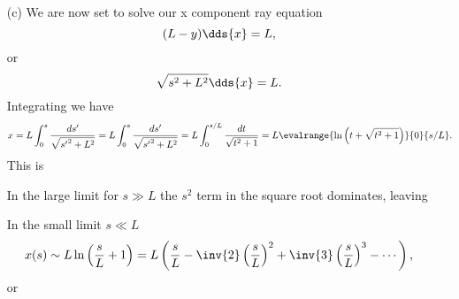 {\begin{enumerate}
In the large limit for \(s \gg L\) the \(s^2\) term dominates, leaving
A plot of \(y/L\), \(-s/L\), and \(-s^2/2 L^2\) can be found in \cref{fig:modernOpticsProblemSet1:modernOpticsProblemSet1Fig2b} and \cref{fig:modernOpticsProblemSet1:modernOpticsProblemSet1Fig2bBig}.
%
%
\item[(c)]
We are now set to solve our x component ray equation
%
\begin{equation}\label{eqn:modernOpticsProblemSet1P2:290}
(L - y) \dds{x} = L,
\end{equation}
%
or
\begin{equation}\label{eqn:modernOpticsProblemSet1P2:310}
\sqrt{s^2 + L^2} \dds{x} = L.
\end{equation}
%
Integrating we have
%
\begin{dmath}\label{eqn:modernOpticsProblemSet1P2:330}
x
= L \int_0^s \frac{ds'}{\sqrt{{s'}^2 + L^2}}
= L \int_0^s \frac{ds'}{\sqrt{{s'}^2 + L^2}}
= L \int_0^{s/L} \frac{dt}{\sqrt{t^2 + 1}}
= L \evalrange{ \ln\left( t + \sqrt{ t^2 + 1} \right) }{0}{s/L}.
\end{dmath}
%
This is

In the large limit for \(s \gg L\) the \(s^2\) term in the square root dominates, leaving

In the small limit \(s \ll L\)
%
\begin{dmath}\label{eqn:modernOpticsProblemSet1P2:390}
x(s) \sim L \ln\left( \frac{s}{L} + 1 \right)
= L \left(
\frac{s}{L}
 -\inv{2}
\left(
\frac{s}{L}
\right)^2
 +\inv{3}
\left(
\frac{s}{L}
\right)^3
- \cdots
\right),
\end{dmath}
%
or


\end{enumerate}}
